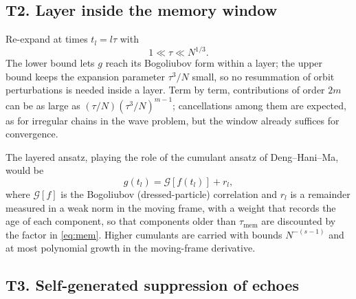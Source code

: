\documentclass[11pt]{article}
\theoremstyle{definition}
\begin{document}
\subsection{T2. Layer inside the memory window}

Re-expand at times $t_l = l\tau$ with
\begin{equation}
  1 \ll \tau \ll N^{1/3}.
\end{equation}
The lower bound lets $g$ reach its Bogoliubov form within a layer; the upper
bound keeps the expansion parameter $\tau^3/N$ small, so no resummation of
orbit perturbations is needed inside a layer. Term by term, contributions of
order $2m$ can be as large as $(\tau/N)(\tau^3/N)^{m-1}$; cancellations among
them are expected, as for irregular chains in the wave problem, but the
window already suffices for convergence.

The layered ansatz, playing the role of the cumulant ansatz of
Deng--Hani--Ma, would be
\begin{equation}
  g(t_l) = \mathcal{G}[f(t_l)] + r_l ,
\end{equation}
where $\mathcal{G}[f]$ is the Bogoliubov (dressed-particle) correlation and
$r_l$ is a remainder measured in a weak norm in the moving frame, with a
weight that records the age of each component, so that components older than
$\tau_{\mathrm{mem}}$ are discounted by the factor in \eqref{eq:mem}. Higher
cumulants are carried with bounds $N^{-(s-1)}$ and at most polynomial growth
in the moving-frame derivative.

\subsection{T3. Self-generated suppression of echoes}
\end{document}

